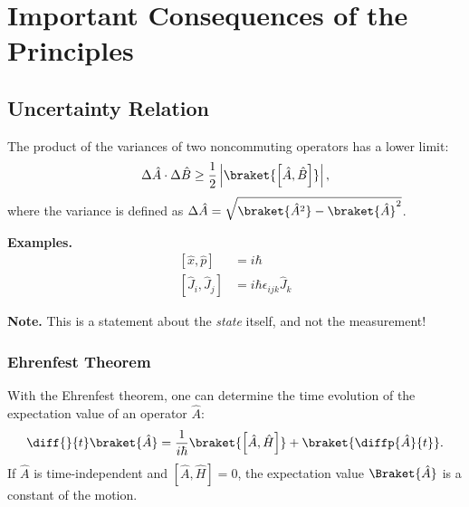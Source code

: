 \section{Important Consequences of the Principles}
\subsection{Uncertainty Relation}

The product of the variances of two noncommuting operators has a lower limit:
\begin{align}
    \Delta \hat{A} \cdot \Delta \hat{B} \geq \frac{1}{2} \left| \braket{\left[\hat{A},\hat{B}\right]} \right|,
\end{align}
where the variance is defined as $\Delta \hat{A} = \sqrt{\braket{\hat{A}^2}-\braket{\hat{A}}^2}$.

\textbf{Examples.}
\begin{align}
	\left[ \hat{x}, \hat{p} \right] &= i \hbar \\
\left[ \hat{J}_i , \hat{J}_j \right] &= i \hbar \epsilon_{ijk} \hat{J}_k
\end{align}
				
\textbf{Note.} This is a statement about the \emph{state} itself, and not the measurement!

			\subsubsection{Ehrenfest Theorem}
				With the Ehrenfest theorem, one can determine the time evolution of the expectation value of an operator $\hat{A}$:
				\begin{align}
					\diff{}{t}\braket{\hat{A}}=\frac{1}{i\hbar}\braket{\left[\hat{A},\hat{H}\right]}+\braket{\diffp{\hat{A}}{t}}. \label{eq:ehrenfest}
				\end{align}
				If $\hat{A}$ is time-independent and $\left[\hat{A},\hat{H}\right]=0$, the expectation value $\Braket{\hat{A}}$ is a constant of the motion.

	